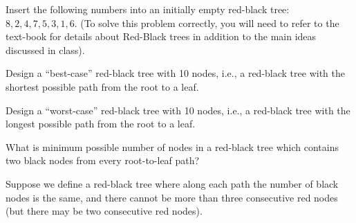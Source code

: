 \documentclass[addpoints,12pt]{exam}
\begin{document}
\begin{questions}

\question
Insert the following numbers into an initially empty red-black tree: $8, 2, 4, 7, 5, 3, 1, 6$. 
(To solve this problem correctly, you will need to refer to the text-book for details about Red-Black trees in 
addition to the main ideas discussed in class).

\question
Design a ``best-case'' red-black tree with 10 nodes, i.e., a red-black tree with the shortest 
possible path from the root to a leaf.

\question
Design a ``worst-case'' red-black tree with 10 nodes, i.e., a red-black tree with the longest 
possible path from the root to a leaf.

\question
What is minimum possible number of nodes in a red-black tree which contains two black nodes 
from every root-to-leaf path? 

\question
Suppose we define a red-black tree where along each path the number of black nodes is the 
same, and there cannot be more than three consecutive red nodes (but there may be two 
consecutive red nodes).

\end{questions}
\end{document}

